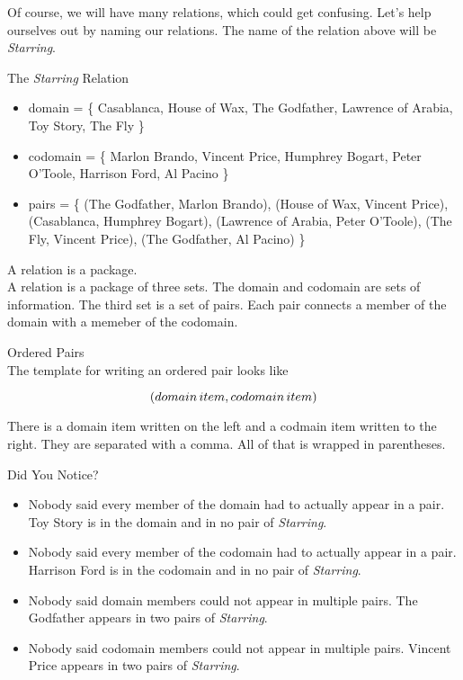 \documentclass{ximera}
\begin{document}
Of course, we will have many relations, which could get confusing.  Let's help ourselves out by naming our relations.  The name of the relation above will be \textit{Starring}.


\begin{example} The \textit{Starring} Relation\\
\begin{itemize}
\item domain = \{ Casablanca, House of Wax,  The Godfather, Lawrence of Arabia, Toy Story, The Fly \}  
\item codomain = \{ Marlon Brando, Vincent Price, Humphrey Bogart, Peter O'Toole, Harrison Ford, Al Pacino  \} 
\item pairs = \{ (The Godfather, Marlon Brando), (House of Wax, Vincent Price), (Casablanca, Humphrey Bogart), (Lawrence of Arabia, Peter O'Toole), (The Fly, Vincent Price), (The Godfather, Al Pacino) \} 
\end{itemize}
\end{example}


A relation is a package.  \\

A relation is a package of three sets. The domain and codomain are sets of information.  The third set is a set of pairs.  Each pair connects a member of the domain with a memeber of the codomain. 


\begin{template} Ordered Pairs \\
The template for writing an ordered pair looks like  

\[
\large{( domain \, item, codomain \, item )}
\]
\end{template}

There is a domain item written on the left and a codmain item written to the right.  They are separated with a comma.  All of that is wrapped in parentheses.


\begin{warning} Did You Notice? \\
\begin{itemize}
\item Nobody said every member of the domain had to actually appear in a pair.  Toy Story is in the domain and in no pair of \textit{Starring}.
\item Nobody said every member of the codomain had to actually appear in a pair.  Harrison Ford is in the codomain and in no pair of \textit{Starring}.
\item Nobody said domain members could not appear in multiple pairs.  The Godfather appears in two pairs of \textit{Starring}.
\item Nobody said codomain members could not appear in multiple pairs.  Vincent Price appears in two pairs of \textit{Starring}.
\end{itemize}
\end{warning}
\end{document}
